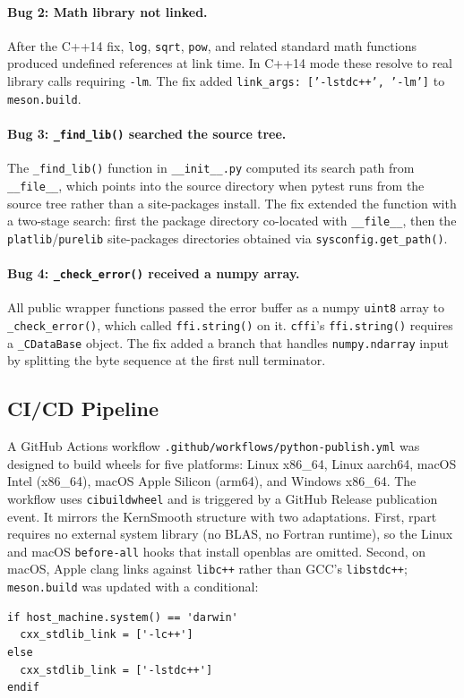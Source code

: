 \documentclass[12pt]{article}
\begin{document}
\paragraph{Bug 2: Math library not linked.} After the C++14 fix, \texttt{log}, \texttt{sqrt}, \texttt{pow}, and related standard math functions produced undefined references at link time. In C++14 mode these resolve to real library calls requiring \texttt{-lm}. The fix added \texttt{link\_args: ['-lstdc++', '-lm']} to \texttt{meson.build}.

\paragraph{Bug 3: \texttt{\_find\_lib()} searched the source tree.} The \texttt{\_find\_lib()} function in \texttt{\_\_init\_\_.py} computed its search path from \texttt{\_\_file\_\_}, which points into the source directory when pytest runs from the source tree rather than a site-packages install. The fix extended the function with a two-stage search: first the package directory co-located with \texttt{\_\_file\_\_}, then the \texttt{platlib}/\texttt{purelib} site-packages directories obtained via \texttt{sysconfig.get\_path()}.

\paragraph{Bug 4: \texttt{\_check\_error()} received a numpy array.} All public wrapper functions passed the error buffer as a numpy \texttt{uint8} array to \texttt{\_check\_error()}, which called \texttt{ffi.string()} on it. \texttt{cffi}'s \texttt{ffi.string()} requires a \texttt{\_CDataBase} object. The fix added a branch that handles \texttt{numpy.ndarray} input by splitting the byte sequence at the first null terminator.

\subsection{CI/CD Pipeline}

A GitHub Actions workflow \texttt{.github/workflows/python-publish.yml} was designed to build wheels for five platforms: Linux x86\_64, Linux aarch64, macOS Intel (x86\_64), macOS Apple Silicon (arm64), and Windows x86\_64. The workflow uses \texttt{cibuildwheel} and is triggered by a GitHub Release publication event. It mirrors the KernSmooth structure with two adaptations. First, rpart requires no external system library (no BLAS, no Fortran runtime), so the Linux and macOS \texttt{before-all} hooks that install openblas are omitted. Second, on macOS, Apple clang links against \texttt{libc++} rather than GCC's \texttt{libstdc++}; \texttt{meson.build} was updated with a conditional:
\begin{lstlisting}[style=bash]
if host_machine.system() == 'darwin'
  cxx_stdlib_link = ['-lc++']
else
  cxx_stdlib_link = ['-lstdc++']
endif
\end{lstlisting}
\end{document}
